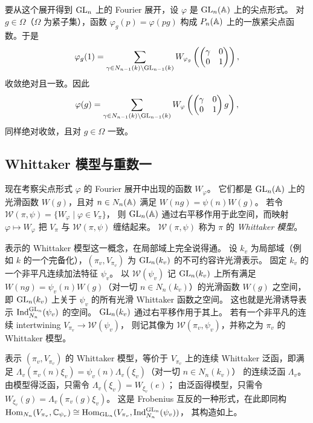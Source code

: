 要从这个展开得到 $\mathrm{GL}_n$ 上的 Fourier 展开，设 $\varphi$ 是 $\mathrm{GL}_n(\mathbb{A})$ 上的尖点形式。
对 $g\in\Omega$（$\Omega$ 为紧子集），函数 $\varphi_g(p)=\varphi(pg)$
构成 $P_n(\mathbb{A})$ 上的一族紧尖点函数。于是
\[
\varphi_g(1)=\sum_{\gamma\in N_{n-1}(k)\backslash\mathrm{GL}_{n-1}(k)}
W_{\varphi_g}\left(\begin{pmatrix}\gamma&0\\0&1\end{pmatrix}\right),
\]
收敛绝对且一致。因此
\[
\varphi(g)=\sum_{\gamma\in N_{n-1}(k)\backslash\mathrm{GL}_{n-1}(k)}
W_\varphi\left(\begin{pmatrix}\gamma&0\\0&1\end{pmatrix}g\right),
\]
同样绝对收敛，且对 $g\in\Omega$ 一致。

\subsection{Whittaker 模型与重数一}

现在考察尖点形式 $\varphi$ 的 Fourier 展开中出现的函数 $W_\varphi$。
它们都是 $\mathrm{GL}_n(\mathbb{A})$ 上的光滑函数 $W(g)$，且对 $n\in N_n(\mathbb{A})$ 满足
$W(ng)=\psi(n)W(g)$。
若令 $\mathcal{W}(\pi,\psi)=\{W_\varphi\mid\varphi\in V_\pi\}$，
则 $\mathrm{GL}_n(\mathbb{A})$ 通过右平移作用于此空间，而映射 $\varphi\mapsto W_\varphi$
把 $V_\pi$ 与 $\mathcal{W}(\pi,\psi)$ 缠结起来。
$\mathcal{W}(\pi,\psi)$ 称为 $\pi$ 的 \emph{Whittaker 模型}。

表示的 Whittaker 模型这一概念，在局部域上完全说得通。
设 $k_v$ 为局部域（例如 $k$ 的一个完备化），$(\pi_v,V_{\pi_v})$ 为
$\mathrm{GL}_n(k_v)$ 的不可约容许光滑表示。
固定 $k_v$ 的一个非平凡连续加法特征 $\psi_v$。
以 $\mathcal{W}(\psi_v)$ 记 $\mathrm{GL}_n(k_v)$ 上所有满足
$W(ng)=\psi_v(n)W(g)$（对一切 $n\in N_n(k_v)$）的光滑函数 $W(g)$ 之空间，
即 $\mathrm{GL}_n(k_v)$ 上关于 $\psi_v$ 的所有光滑 Whittaker 函数之空间。
这也就是光滑诱导表示 $\operatorname{Ind}_{N_n}^{\mathrm{GL}_n}(\psi_v)$ 的空间。
$\mathrm{GL}_n(k_v)$ 通过右平移作用于其上。
若有一个非平凡的连续 intertwining $V_{\pi_v}\to\mathcal{W}(\psi_v)$，
则记其像为 $\mathcal{W}(\pi_v,\psi_v)$，并称之为 $\pi_v$ 的 Whittaker 模型。

表示 $(\pi_v,V_{\pi_v})$ 的 Whittaker 模型，等价于 $V_{\pi_v}$ 上的连续
Whittaker 泛函，即满足
$\Lambda_v(\pi_v(n)\xi_v)=\psi_v(n)\Lambda_v(\xi_v)$（对一切 $n\in N_n(k_v)$）
的连续泛函 $\Lambda_v$。
由模型得泛函，只需令 $\Lambda_v(\xi_v)=W_{\xi_v}(e)$；
由泛函得模型，只需令 $W_{\xi_v}(g)=\Lambda_v(\pi_v(g)\xi_v)$。
这是 Frobenius 互反的一种形式，在此即同构
$\operatorname{Hom}_{N_n}(V_{\pi_v},\mathbb{C}_{\psi_v})\cong\operatorname{Hom}_{\mathrm{GL}_n}(V_{\pi_v},\operatorname{Ind}_{N_n}^{\mathrm{GL}_n}(\psi_v))$，
其构造如上。

